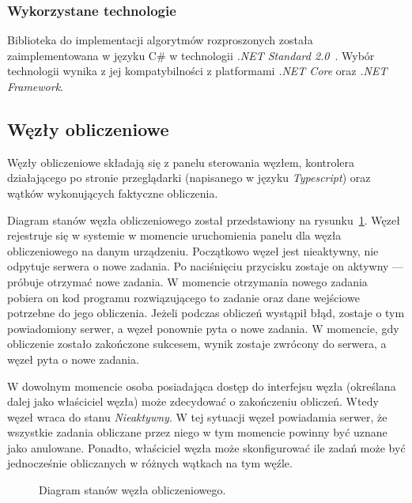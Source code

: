 \documentclass[a4paper,11pt,twoside]{report}
\theoremstyle{definition}
\begin{document}
\subsubsection{Wykorzystane technologie}
Biblioteka do implementacji algorytmów rozproszonych została zaimplementowana w języku C\# w technologii \textit{.NET Standard 2.0}~\cite{dotnet-standard}. Wybór technologii wynika z jej kompatybilności z platformami \textit{.NET Core} oraz \textit{.NET Framework}.

\subsection{Węzły obliczeniowe}

Węzły obliczeniowe składają się z panelu sterowania węzłem, kontrolera działającego po stronie przeglądarki (napisanego w języku \textit{Typescript}) oraz wątków wykonujących faktyczne obliczenia.

Diagram stanów węzła obliczeniowego został przedstawiony na rysunku~\ref{node-state}. Węzeł rejestruje się w systemie w momencie uruchomienia panelu dla węzła obliczeniowego na danym urządzeniu.
Początkowo węzeł jest nieaktywny, nie odpytuje serwera o nowe zadania.
Po naciśnięciu przycisku zostaje on aktywny --- próbuje otrzymać nowe zadania.
W momencie otrzymania nowego zadania pobiera on kod programu rozwiązującego to zadanie oraz dane wejściowe potrzebne do jego obliczenia. Jeżeli podczas obliczeń wystąpił błąd, zostaje o tym powiadomiony serwer, a węzeł ponownie pyta o nowe zadania.
W momencie, gdy obliczenie zostało zakończone sukcesem, wynik zostaje zwrócony do serwera, a węzeł pyta o nowe zadania.

W dowolnym momencie osoba posiadająca dostęp do interfejsu węzła (określana dalej jako właściciel węzła) może zdecydować o zakończeniu obliczeń. Wtedy węzeł wraca do stanu \textit{Nieaktywny}. W tej sytuacji węzeł powiadamia serwer, że wszystkie zadania obliczane przez niego w tym momencie powinny być uznane jako anulowane.
Ponadto, właściciel węzła może skonfigurować ile zadań może być jednocześnie obliczanych w różnych wątkach na tym węźle.

\begin{figure} 
    \caption{Diagram stanów węzła obliczeniowego.}
    \label{node-state}
\end{figure}
\end{document}
